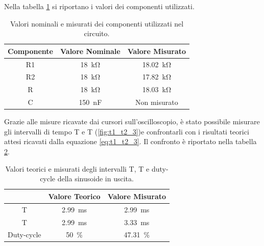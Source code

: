 \noindent
Nella tabella \ref{tab:valori_componenti_3} si riportano i valori dei componenti utilizzati.
\def\arraystretch{1.3}
\begin{table}[h]
	\centering
	\begin{tabular}{|c|c|c|}
		\hline
		Componente	& Valore Nominale & Valore Misurato \\ \hline
		R1 &\SI{18}{\kilo\ohm} & \SI{18,02}{\kilo\ohm} \\ \hline
		R2 &\SI{18}{\kilo\ohm} & \SI{17,82}{\kilo\ohm} \\ \hline
		R & \SI{18}{\kilo\ohm} & \SI{18,03}{\kilo\ohm} \\ \hline
		C & \SI{150}{\nano\farad} & Non misurato \\ \hline
	\end{tabular}
	\caption{Valori nominali e misurati dei componenti utilizzati nel circuito.}
	\label{tab:valori_componenti_3}
\end{table}
Grazie alle misure ricavate dai cursori sull'oscilloscopio, è stato possibile misurare gli intervalli di tempo T e T (\Fig\ref{fig:t1_t2_3})e confrontarli con i risultati teorici attesi ricavati dalla equazione \ref{eq:t1_t2_3}. Il confronto è riportato nella tabella \ref{tab:misure_duty_3}.
\begin{table}[h]
	\centering
	\begin{tabular}{|c|c|c|}
		\hline
		& Valore Teorico & Valore Misurato \\ \hline
		T\sub{1} &\SI{2.99}{\milli\second} & \SI{2.99}{\milli\second} \\ \hline
		T\sub{2} &\SI{2.99}{\milli\second} & \SI{3.33}{\milli\second} \\ \hline
		Duty-cycle & \SI{50}{\percent} & \SI{47.31}{\percent} \\ \hline
	\end{tabular}
	\caption{Valori teorici e misurati degli intervalli T, T e duty-cycle della sinusoide in uscita.}
	\label{tab:misure_duty_3}
\end{table}

